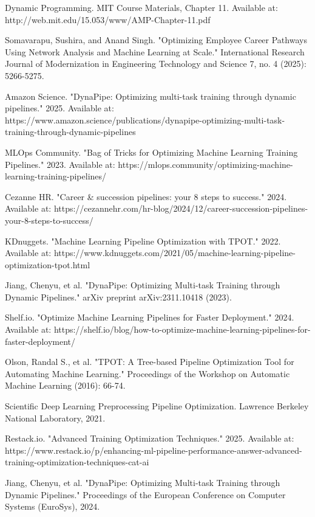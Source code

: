 \documentclass[main.tex]{subfiles}
\begin{document}
\begin{thebibliography}{21}
Dynamic Programming. MIT Course Materials, Chapter 11. Available at: http://web.mit.edu/15.053/www/AMP-Chapter-11.pdf

Somavarapu, Sushira, and Anand Singh. "Optimizing Employee Career Pathways Using Network Analysis and Machine Learning at Scale." International Research Journal of Modernization in Engineering Technology and Science 7, no. 4 (2025): 5266-5275.

Amazon Science. "DynaPipe: Optimizing multi-task training through dynamic pipelines." 2025. Available at: https://www.amazon.science/publications/dynapipe-optimizing-multi-task-training-through-dynamic-pipelines

MLOps Community. "Bag of Tricks for Optimizing Machine Learning Training Pipelines." 2023. Available at: https://mlops.community/optimizing-machine-learning-training-pipelines/

Cezanne HR. "Career \& succession pipelines: your 8 steps to success." 2024. Available at: https://cezannehr.com/hr-blog/2024/12/career-succession-pipelines-your-8-steps-to-success/

KDnuggets. "Machine Learning Pipeline Optimization with TPOT." 2022. Available at: https://www.kdnuggets.com/2021/05/machine-learning-pipeline-optimization-tpot.html

Jiang, Chenyu, et al. "DynaPipe: Optimizing Multi-task Training through Dynamic Pipelines." arXiv preprint arXiv:2311.10418 (2023).

Shelf.io. "Optimize Machine Learning Pipelines for Faster Deployment." 2024. Available at: https://shelf.io/blog/how-to-optimize-machine-learning-pipelines-for-faster-deployment/

Olson, Randal S., et al. "TPOT: A Tree-based Pipeline Optimization Tool for Automating Machine Learning." Proceedings of the Workshop on Automatic Machine Learning (2016): 66-74.

Scientific Deep Learning Preprocessing Pipeline Optimization. Lawrence Berkeley National Laboratory, 2021.

Restack.io. "Advanced Training Optimization Techniques." 2025. Available at: https://www.restack.io/p/enhancing-ml-pipeline-performance-answer-advanced-training-optimization-techniques-cat-ai

Jiang, Chenyu, et al. "DynaPipe: Optimizing Multi-task Training through Dynamic Pipelines." Proceedings of the European Conference on Computer Systems (EuroSys), 2024.

\end{thebibliography}
\end{document}
